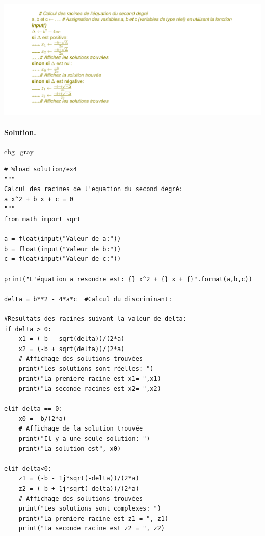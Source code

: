\documentclass[%
oneside,                 %
final,                   %
10pt,french]{article}
\newenvironment{_cod_tight}[1]{
   \def\FrameCommand{\colorbox{#1}}
   \FrameRule0.6pt\MakeFramed {\FrameRestore}\vskip3mm}
   {\vskip0mm\endMakeFramed}
\newenvironment{cod}[1]{
\bgroup\rmfamily
\fboxsep=0mm\relax
\begin{_cod_tight}{#1}
\list{}{\parsep=-2mm\parskip=0mm\topsep=0pt\leftmargin=2mm
\rightmargin=2\leftmargin\leftmargin=4pt\relax}
\item\relax}
{\endlist\end{_cod_tight}\egroup}
\newenvironment{doconceexercise}{}{}
\begin{document}
\begin{doconceexercise}
\centerline{\includegraphics[width=1.2\linewidth]{imgs/algo1.png}}

\vspace{6mm}





\paragraph{Solution.}
\begin{cod}{cbg_gray}\begin{verbatim}
# %load solution/ex4
"""
Calcul des racines de l'equation du second degré:
a x^2 + b x + c = 0
"""
from math import sqrt

a = float(input("Valeur de a:"))
b = float(input("Valeur de b:"))
c = float(input("Valeur de c:"))

print("L'équation a resoudre est: {} x^2 + {} x + {}".format(a,b,c))

delta = b**2 - 4*a*c  #Calcul du discriminant:

#Resultats des racines suivant la valeur de delta:
if delta > 0:
    x1 = (-b - sqrt(delta))/(2*a)
    x2 = (-b + sqrt(delta))/(2*a)
    # Affichage des solutions trouvées
    print("Les solutions sont réelles: ")
    print("La premiere racine est x1= ",x1)
    print("La seconde racines est x2= ",x2)

elif delta == 0:
    x0 = -b/(2*a)
    # Affichage de la solution trouvée
    print("Il y a une seule solution: ")
    print("La solution est", x0)

elif delta<0:
    z1 = (-b - 1j*sqrt(-delta))/(2*a)
    z2 = (-b + 1j*sqrt(-delta))/(2*a)
    # Affichage des solutions trouvées
    print("Les solutions sont complexes: ")
    print("La premiere racine est z1 = ", z1)
    print("La seconde racine est z2 = ", z2)
\end{verbatim}
\end{cod}
\noindent


\end{doconceexercise}
\end{document}
